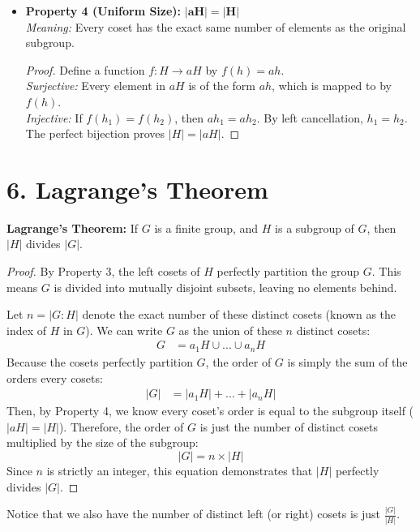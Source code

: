\documentclass[12pt]{article}
\begin{document}
\begin{itemize}
\begin{proof}
              By Property 2, this implies $aH = bH$.

              Therefore, any two cosets are either perfectly disjoint or exactly identical.
          \end{proof}

    \item \textbf{Property 4 (Uniform Size):} $\mathbf{|aH| = |H|}$ \\
          \textit{Meaning:} Every coset has the exact same number of elements as the original subgroup.
          \begin{proof}
              Define a function $f: H \to aH$ by $f(h) = ah$. \\

              \textit{Surjective:} Every element in $aH$ is of the form $ah$, which is mapped to by $f(h)$. \\

              \textit{Injective:} If $f(h_1) = f(h_2)$, then $ah_1 = ah_2$. By left cancellation, $h_1 = h_2$. \\

              The perfect bijection proves $|H| = |aH|$.
          \end{proof}
\end{itemize}

\section*{6. Lagrange's Theorem}

\begin{mdframed}
    \textbf{Lagrange's Theorem:} If $G$ is a finite group, and $H$ is a subgroup of $G$, then $|H|$ divides $|G|$.
\end{mdframed}

\begin{proof}
    By Property 3, the left cosets of $H$ perfectly partition the group $G$.
    This means $G$ is divided into mutually disjoint subsets, leaving no elements behind.

    Let $n = |G:H|$ denote the exact number of these distinct cosets (known as the index of $H$ in $G$).
    We can write $G$ as the union of these $n$ distinct cosets:
    \begin{align*}
        G & = a_1H \cup ... \cup a_nH
    \end{align*}
    Because the cosets perfectly partition $G$, the order of $G$ is simply the sum of the orders every cosets:
    \begin{align*}
        |G| & = |a_1H| + ... + |a_nH|
    \end{align*}
    Then, by Property 4, we know every coset's order is equal to the subgroup itself ($|aH| = |H|$). Therefore, the  order of $G$ is just the number of distinct cosets multiplied by the size of the subgroup:
    $$ |G| = n \times |H| $$
    Since $n$ is strictly an integer, this equation demonstrates that $|H|$ perfectly divides $|G|$.
\end{proof}
Notice that we also have the number of distinct left (or right) cosets is just $\frac{|G|}{|H|}$.
\end{document}

